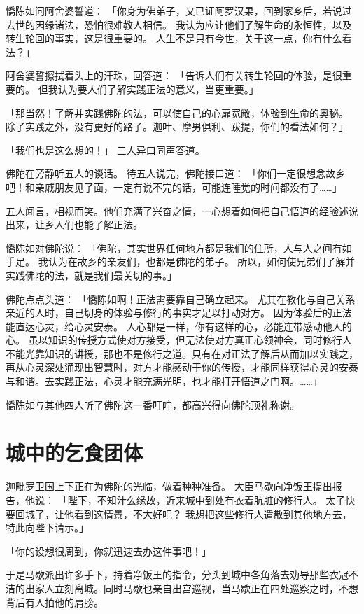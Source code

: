 \documentclass[twoside,openany]{book}
\begin{document}
憍陈如问阿舍婆誓道：
「你身为佛弟子，又已证阿罗汉果，回到家乡后，若说过去世的因缘诸法，恐怕很难教人相信。
我认为应让他们了解生命的永恒性，以及转生轮回的事实，这是很重要的。
人生不是只有今世，关于这一点，你有什么看法？」

阿舍婆誓擦拭着头上的汗珠，回答道：
「告诉人们有关转生轮回的体验，是很重要的。
但我认为要人们了解实践正法的意义，当更重要。」

「那当然！了解并实践佛陀的法，可以使自己的心扉宽敞，体验到生命的奥秘。
除了实践之外，没有更好的路子。迦叶、摩男俱利、跋提，你们的看法如何？」 

「我们也是这么想的！」
三人异口同声答道。

佛陀在旁静听五人的谈话。
待五人说完，佛陀接口道：
「你们一定很想念故乡吧！和亲戚朋友见了面，一定有说不完的话，可能连睡觉的时间都没有了……」

五人闻言，相视而笑。他们充满了兴奋之情，一心想着如何把自己悟道的经验述说出来，让乡人们也能了解正法。

憍陈如对佛陀说：
「佛陀，其实世界任何地方都是我们的住所，人与人之间有如手足。
我认为在故乡的亲友们，也都是佛陀的弟子。
所以，如何使兄弟们了解并实践佛陀的法，就是我们最关切的事。」

佛陀点点头道：
「憍陈如啊！正法需要靠自己确立起来。
尤其在教化与自己关系亲近的人时，自己切身的体验与修行的事实才足以打动对方。
因为体验后的正法能直达心灵，给心灵安泰。
人心都是一样，你有这样的心，必能连带感动他人的心。
虽以知识的传授方式使对方接受，但无法使对方真正心领神会，同时修行人不能光靠知识的讲授，那也不是修行之道。只有在对正法了解后从而加以实践之，再从心灵深处涌现出智慧时，对方才能感动于你的传授，才能同样获得心灵的安泰与和谐。去实践正法，心灵才能充满光明，也才能打开悟道之门啊。……」

憍陈如与其他四人听了佛陀这一番叮咛，都高兴得向佛陀顶礼称谢。

\section{城中的乞食团体}\label{sec8.2}
迦毗罗卫国上下正在为佛陀的光临，做着种种准备。
大臣马歇向净饭王提出报告，他说：
「陛下，不知汁么缘故，近来城中到处有衣着肮脏的修行人。
太子快要回城了，让他看到这情景，不大好吧？
我想把这些修行人遣散到其他地方去，特此向陛下请示。」

「你的设想很周到，你就迅速去办这件事吧！」

于是马歇派出许多手下，持着净饭王的指令，分头到城中各角落去劝导那些衣冠不洁的出家人立刻离城。同时马歇也亲自出宫巡视，当马歇正在四处巡察之时，不想背后有人拍他的肩膀。
\end{document}
